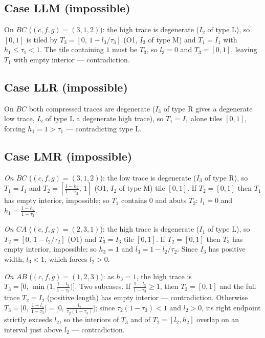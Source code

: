 \documentclass[11pt,reqno]{amsart}
\theoremstyle{plain}
\theoremstyle{definition}
\theoremstyle{remark}
\begin{document}
\subsection*{Case LLM \textup(impossible\textup)}
On $BC$ ($(c,f,g)=(3,1,2)$): the high trace is degenerate ($I_2$ of type
$\mathrm L$), so $[0,1]$ is tiled by $T_3=[0,\,1-l_3/\tau_3]$ (O1, $I_3$ of
type $\mathrm M$) and $T_1=I_1$ with $h_1\le\tau_1<1$. The tile containing $1$
must be $T_3$, so $l_3=0$ and $T_3=[0,1]$, leaving $T_1$ with empty interior
--- contradiction.

\subsection*{Case LLR \textup(impossible\textup)}
On $BC$ both compressed traces are degenerate ($I_3$ of type $\mathrm R$ gives
a degenerate low trace, $I_2$ of type $\mathrm L$ a degenerate high trace), so
$T_1=I_1$ alone tiles $[0,1]$, forcing $h_1=1>\tau_1$ --- contradicting type
$\mathrm L$.

\subsection*{Case LMR \textup(impossible\textup)}
\emph{On $BC$} ($(c,f,g)=(3,1,2)$): the low trace is degenerate ($I_3$ of type
$\mathrm R$), so $T_1=I_1$ and $T_2=[\tfrac{1-h_2}{1-\tau_2},\,1]$ (O1, $I_2$
of type $\mathrm M$) tile $[0,1]$. If $T_2=[0,1]$ then $T_1$ has empty
interior, impossible; so $T_1$ contains $0$ and abuts $T_2$: $l_1=0$ and
$h_1=\tfrac{1-h_2}{1-\tau_2}$.

\emph{On $CA$} ($(c,f,g)=(2,3,1)$): the high trace is degenerate ($I_1$ of type
$\mathrm L$), so $T_2=[0,\,1-l_2/\tau_2]$ (O1) and $T_3=I_3$ tile $[0,1]$. If
$T_2=[0,1]$ then $T_3$ has empty interior, impossible; so $h_3=1$ and
$l_3=1-l_2/\tau_2$. Since $I_3$ has positive width, $l_3<1$, which forces
$l_2>0$.

\emph{On $AB$} ($(c,f,g)=(1,2,3)$): as $h_3=1$, the high trace is
$T_3=\bigl[0,\,\min\bigl(1,\tfrac{1-l_3}{1-\tau_3}\bigr)\bigr]$. Two subcases.
If $\tfrac{1-l_3}{1-\tau_3}\ge1$, then $T_3=[0,1]$ and the full trace
$T_2=I_2$ (positive length) has empty interior --- contradiction. Otherwise
$T_3=\bigl[0,\,\tfrac{1-l_3}{1-\tau_3}\bigr]
=\bigl[0,\,\tfrac{l_2}{\tau_2(1-\tau_3)}\bigr]$; since $\tau_2(1-\tau_3)<1$
and $l_2>0$, its right endpoint strictly exceeds $l_2$, so the interiors of
$T_3$ and of $T_2=[l_2,h_2]$ overlap on an interval just above $l_2$ ---
contradiction.
\end{document}
